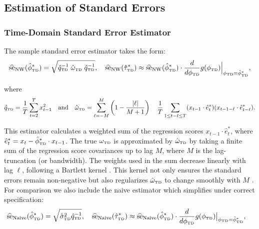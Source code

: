 \documentclass[docs/main.tex]{subfiles}
\begin{document}
\subsection{Estimation of Standard Errors}\label{sec:stderr_}
\subsubsection{Time-Domain Standard Error Estimator}\label{sec:stderr-time-domain_}
The sample standard error estimator takes the form:
\begin{align}\label{eq:stderr-time-domain_}
\widehat{\text{se}}_{\text{NW}}(\hat{\phi}^*_{\scriptscriptstyle\text{TD}}) = \sqrt{\hat{q}_{\scriptscriptstyle\text{TD}}^{-1}\;\hat{\omega}_{\scriptscriptstyle\text{TD}}\; \hat{q}_{\scriptscriptstyle\text{TD}}^{-1}}, \quad
\widehat{\text{se}}_{\text{NW}}(\hat{\tau}^*_{\scriptscriptstyle\text{TD}}) \approx \widehat{\text{se}}_{\text{NW}}(\hat{\phi}^*_{\scriptscriptstyle\text{TD}}) \cdot \frac{d}{d\phi_{\scriptscriptstyle\text{TD}}} g(\phi_{\scriptscriptstyle\text{TD}})\Big|_{\phi_{\scriptscriptstyle\text{TD}}=\hat{\phi}^*_{\scriptscriptstyle\text{TD}}},
\end{align}

\noindent where
\begin{align}\label{eq:lls_q_omega_}
    \hat{q}_{\scriptscriptstyle\text{TD}} = \frac{1}{T} \sum_{t=2}^T x_{t-1}^2 \quad\text{and}\quad
    \hat{\omega}_{\scriptscriptstyle\text{TD}} = \sum_{\ell=-M}^M \left(1 - \frac{|\ell|}{M+1}\right) \quad \frac{1}{T} \sum_{1\le t - \ell \le T} (x_{t-1} \cdot \hat e_t^*)(x_{t-1-\ell} \cdot \hat e_{t-\ell}^*).
\end{align}

\noindent This estimator calculates a weighted sum of the regression scores $x_{t-1} \cdot \hat e_t^*$, where $\hat e_t^* = x_t - \hat{\phi}^*_{\scriptscriptstyle\text{TD}} \cdot x_{t-1}$. The true $\omega_{\scriptscriptstyle\text{TD}}$ is approximated by $\hat{\omega}_{\scriptscriptstyle\text{TD}}$ by taking a finite sum of the regression score covariances up to lag $M$, where $M$ is the lag-truncation (or bandwidth). The weights used in the sum decrease linearly with lag $\ell$, following a Bartlett kernel \citep{newey_simple_1987}. This kernel not only ensures the standard errors remain non-negative but also regularizes $\hat{\omega}_{\scriptscriptstyle\text{TD}}$ to change smoothly with $M$ \citep[Chapter~14.35]{hansen_econometrics_2022}.\\

\noindent For comparison we also include the naive estimator which simplifies under correct specification:
\begin{align}\label{eq:se-naive_}
    \widehat{\text{se}}_\text{Naive}(\hat{\phi}^*_{\scriptscriptstyle\text{TD}}) &= \sqrt{\hat{\sigma}_{\scriptscriptstyle\text{TD}}^2 \hat{q}_{\scriptscriptstyle\text{TD}}^{-1}},\quad
    \widehat{\text{se}}_\text{Naive}(\hat{\tau}^*_{\scriptscriptstyle\text{TD}}) \approx \widehat{\text{se}}_{\text{Naive}}(\hat{\phi}^*_{\scriptscriptstyle\text{TD}}) \cdot \frac{d}{d\phi_{\scriptscriptstyle\text{TD}}} g(\phi_{\scriptscriptstyle\text{TD}})\big|_{\phi_{\scriptscriptstyle\text{TD}}=\hat{\phi}^*_{\scriptscriptstyle\text{TD}}},
\end{align}
\end{document}
